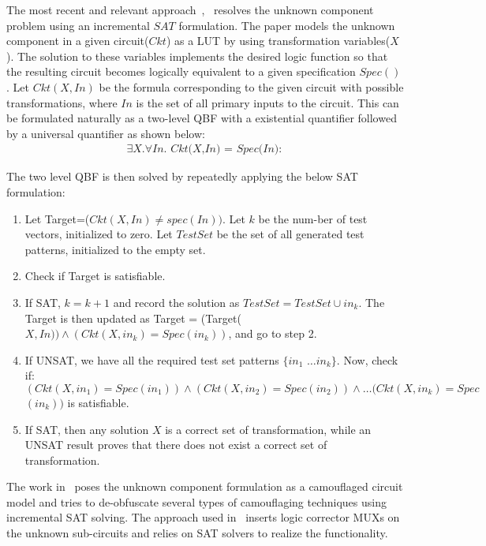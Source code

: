 The most recent and relevant approach~\cite{fujita:2015},~\cite{fujita:2012} resolves the unknown component problem using an incremental $SAT$ formulation. The paper models the unknown component in a given circuit($Ckt$) as a LUT by using transformation variables($X$). The solution to these variables implements the desired logic function so that the resulting circuit becomes logically equivalent to a given specification $Spec()$. Let $Ckt(X,In)$ be the formula corresponding to the given circuit with possible transformations, where $In$ is the set of all primary inputs to the circuit. This can be formulated naturally as a two-level QBF with a existential quantifier followed by a universal quantifier as shown below:
\vspace{0.1in}
\begin{align}
\exists \textit{X}.\forall \textit{In. Ckt(X,In) = Spec(In)}:    
\end{align}

The two level QBF is then solved by repeatedly applying the below SAT formulation:
  
\begin{enumerate}
	\item Let Target=($Ckt(X,In)\neq spec(In))$. Let $k$ be the num-ber of test vectors, initialized to zero. Let $TestSet$ be the set of all generated test patterns, initialized to the empty set.
	\item Check if Target is satisfiable.
	\item If SAT, $k=k+1$ and record the solution as $TestSet = TestSet \cup in_k$. The Target is then updated as Target = (Target($X,In))\land(Ckt(X,in_k)=Spec(in_k))$, and go to step 2.
    \item If UNSAT, we have all the required test set patterns $\{in_1$ $\dots in_k\}$. Now, check if: $(Ckt(X,in_1) = Spec(in_1)) \land (Ckt(X,in_2) = Spec(in_2)) \land \dots (Ckt(X,in_k) = Spec$ $(in_k))$ is satisfiable.
    \item If SAT, then any solution $X$ is a correct set of transformation, while an UNSAT result proves that there does not exist a correct set of transformation.
\end{enumerate}

The work in~\cite{maciej:2017} poses the unknown component formulation as a camouflaged circuit model and tries to de-obfuscate several types of camouflaging techniques using incremental SAT solving. The approach used in~\cite{andreas:2005} inserts logic corrector MUXs on the unknown sub-circuits and relies on SAT solvers to realize the functionality. 

